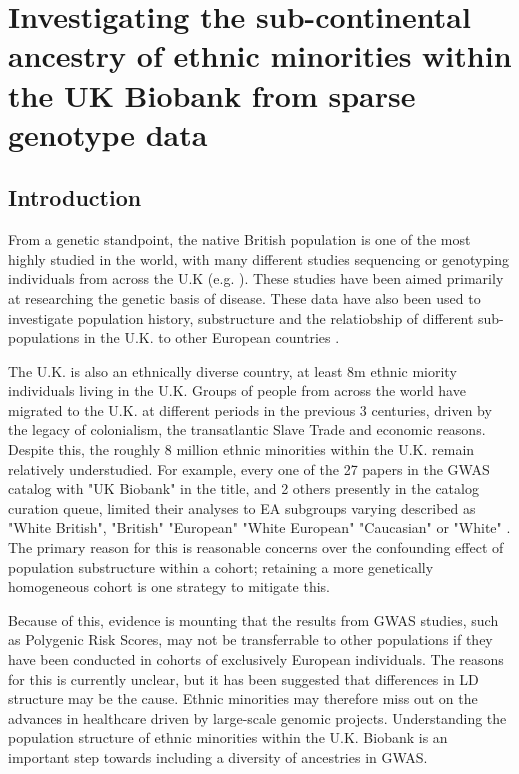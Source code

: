 \chapter{Investigating the sub-continental ancestry of ethnic minorities within the UK Biobank from sparse genotype data}
\label{chapterlabel3}

\section{Introduction}

From a genetic standpoint, the native British population is one of the most highly studied in the world, with many different studies sequencing or genotyping individuals from across the U.K (e.g. \cite{bycroft2018uk, Leslie2015, turnbull2018introducing, uk10k2015uk10k}). These studies have been aimed primarily at researching the genetic basis of disease. These data have also been used to investigate population history, substructure  and the relatiobship of different sub-populations in the U.K. to other European countries \cite{Leslie2015}.  

The U.K. is also an ethnically diverse country, at least 8m ethnic miority individuals living in the U.K. Groups of people from across the world have migrated to the U.K. at different periods in the previous 3 centuries, driven by the legacy of colonialism, the transatlantic Slave Trade and economic reasons. Despite this, the roughly 8 million ethnic minorities within the U.K. remain relatively understudied. For example, every one of the 27 papers in the GWAS catalog with "UK Biobank" in the title, and 2 others presently in the catalog curation queue, limited their analyses to EA subgroups varying described as "White British", "British" "European" "White European" "Caucasian" or "White" \cite{manolio2019using}. The primary reason for this is reasonable concerns over the confounding effect of population substructure within a cohort; retaining a more genetically homogeneous cohort is one strategy to mitigate this. 

Because of this, evidence is mounting that the results from GWAS studies, such as Polygenic Risk Scores, may not be transferrable to other populations if they have been conducted in cohorts of exclusively European individuals. The reasons for this is currently unclear, but it has been suggested that differences in LD structure may be the cause. Ethnic minorities may therefore miss out on the advances in healthcare driven by large-scale genomic projects. Understanding the population structure of ethnic minorities within the U.K. Biobank is an important step towards including a diversity of ancestries in GWAS. 

